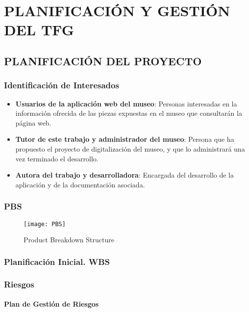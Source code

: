 \newpage
\chapter{PLANIFICACIÓN Y GESTIÓN DEL TFG}
\newpage

\newpage
\section{PLANIFICACIÓN DEL PROYECTO}

\subsection{Identificación de Interesados}
\begin{itemize}
\item \textbf{Usuarios de la aplicación web del museo}: Personas interesadas en la información ofrecida de las piezas expuestas en el museo que consultarán la página web.
\item \textbf{Tutor de este trabajo y administrador del museo}: Persona que ha propuesto el proyecto de digitalización del museo, y que lo administrará una vez terminado el desarrollo.
\item \textbf{Autora del trabajo y desarrolladora}: Encargada del desarrollo de la aplicación y de la documentación asociada.
\end{itemize}


\subsection{%
PBS}
\begin{figure}[H]
\centering
\centerline{\texttt{[image: PBS]}}
\caption{Product Breakdown Structure}
\end{figure}


\subsection{Planificación Inicial. WBS}


\subsection{Riesgos}

\subsubsection{Plan de Gestión de Riesgos} 

